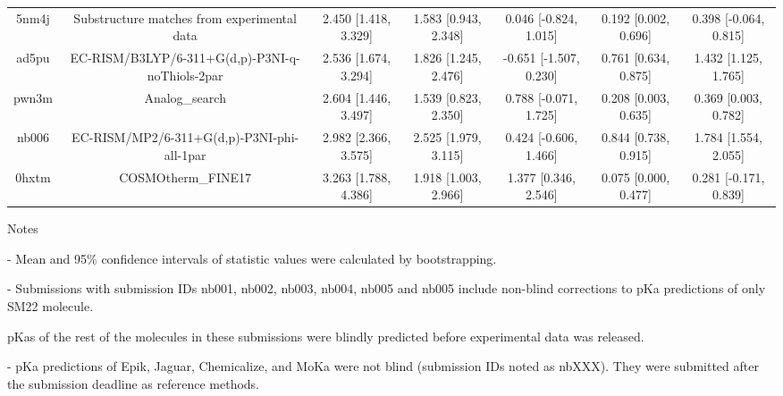 \documentclass{article}
\begin{document}
\begin{center}
\begin{longtable}{|ccccccc|}
 5nm4j &        Substructure matches from experimental data &  2.450 [1.418, 3.329] &  1.583 [0.943, 2.348] &    0.046 [-0.824, 1.015] &  0.192 [0.002, 0.696] &  0.398 [-0.064, 0.815] \\
 ad5pu &    EC-RISM/B3LYP/6-311+G(d,p)-P3NI-q-noThiols-2par &  2.536 [1.674, 3.294] &  1.826 [1.245, 2.476] &   -0.651 [-1.507, 0.230] &  0.761 [0.634, 0.875] &   1.432 [1.125, 1.765] \\
 pwn3m &                                     Analog\_search &  2.604 [1.446, 3.497] &  1.539 [0.823, 2.350] &    0.788 [-0.071, 1.725] &  0.208 [0.003, 0.635] &   0.369 [0.003, 0.782] \\
 nb006 &         EC-RISM/MP2/6-311+G(d,p)-P3NI-phi-all-1par &  2.982 [2.366, 3.575] &  2.525 [1.979, 3.115] &    0.424 [-0.606, 1.466] &  0.844 [0.738, 0.915] &   1.784 [1.554, 2.055] \\
 0hxtm &                                 COSMOtherm\_FINE17 &  3.263 [1.788, 4.386] &  1.918 [1.003, 2.966] &     1.377 [0.346, 2.546] &  0.075 [0.000, 0.477] &  0.281 [-0.171, 0.839] \\
\end{longtable}
\end{center}

Notes

- Mean and 95\% confidence intervals of statistic values were calculated by bootstrapping.

- Submissions with submission IDs nb001, nb002, nb003, nb004, nb005 and nb005 include non-blind corrections to pKa predictions of only SM22 molecule.

pKas of the rest of the molecules in these submissions were blindly predicted before experimental data was released.

- pKa predictions of Epik, Jaguar, Chemicalize, and MoKa were not blind (submission IDs noted as nbXXX). They were submitted after the submission deadline as reference methods.
\end{document}
